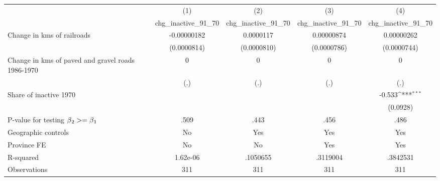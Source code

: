 {
\def\sym#1{\ifmmode^{#1}\else\(^{#1}\)\fi}
\begin{tabular}{l*{4}{c}}
\hline\hline
                &\multicolumn{1}{c}{(1)}&\multicolumn{1}{c}{(2)}&\multicolumn{1}{c}{(3)}&\multicolumn{1}{c}{(4)}\\
                &\multicolumn{1}{c}{chg\_inactive\_91\_70}&\multicolumn{1}{c}{chg\_inactive\_91\_70}&\multicolumn{1}{c}{chg\_inactive\_91\_70}&\multicolumn{1}{c}{chg\_inactive\_91\_70}\\
\hline
Change in kms of railroads&-0.00000182         &0.0000117         &0.00000874         &0.00000262         \\
                &(0.0000814)         &(0.0000810)         &(0.0000786)         &(0.0000744)         \\
[1em]
Change in kms of paved and gravel roads 1986-1970&        0         &        0         &        0         &        0         \\
                &      (.)         &      (.)         &      (.)         &      (.)         \\
[1em]
Share of inactive 1970&                  &                  &                  &   -0.533\sym{***}\\
                &                  &                  &                  & (0.0928)         \\
\hline
P-value for testing $\beta\\_2 >= \beta\\_1$&     .509         &     .443         &     .456         &     .486         \\
Geographic controls&       No         &      Yes         &      Yes         &      Yes         \\
Province FE     &       No         &       No         &      Yes         &      Yes         \\
R-squared       & 1.62e-06         & .1050655         & .3119004         & .3842531         \\
Observations    &      311         &      311         &      311         &      311         \\
\hline\hline
\end{tabular}
}
